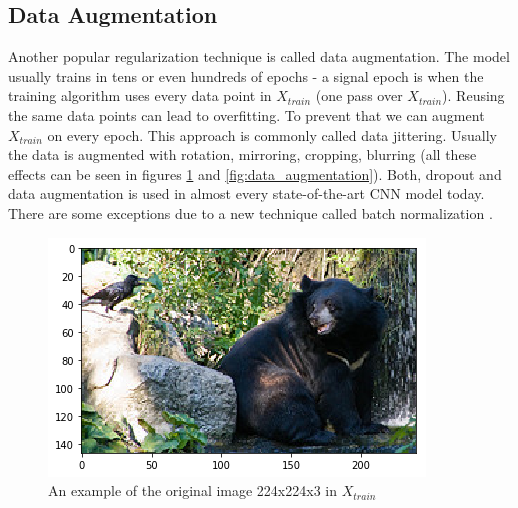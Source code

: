 \documentclass[times, utf8, diplomski]{fer}
\begin{document}
\subsection{Data Augmentation}  \label{se:data_augmentation}

Another popular regularization technique is called data augmentation. The model usually trains in tens or even hundreds of epochs - a signal epoch is when the training algorithm uses every data point in $X_{train}$ (one pass over $X_{train}$). Reusing the same data points can lead to overfitting. To prevent that we can augment $X_{train}$ on every epoch. This approach is commonly called data jittering. Usually the data is augmented with rotation, mirroring, cropping, blurring (all these effects can be seen in figures \ref{fig:data_augmentation_figure} and \ref{fig:data_augmentation}). Both, dropout and data augmentation is used in almost every state-of-the-art CNN model today. There are some exceptions due to a new technique called batch normalization \citep{ioffe_batch_2015}.

\begin{figure}
  \includegraphics[scale=0.7]{figures/data_augmentation.png}
  \centering
  \caption{An example of the original image 224x224x3 in $X_{train}$}
  \label{fig:data_augmentation_figure}
\end{figure}
\end{document}
